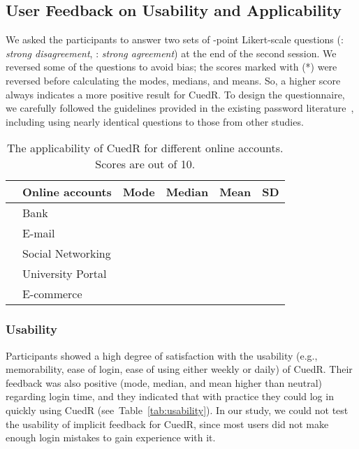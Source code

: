 \subsection{User Feedback on Usability and Applicability}\label{feedback}

We asked the participants to answer two sets of -point Likert-scale questions (: \textit{strong disagreement}, : \textit{strong agreement}) at the end of the second session. We reversed some of the questions to avoid bias; the scores marked with (*) were reversed before calculating the modes, medians, and means. So, a higher score always indicates a more positive result for CuedR. To design the questionnaire, we carefully followed the guidelines provided in the existing password literature~\cite{geopass,ccp,passpoint3}, including using nearly identical questions to those from other studies.

\begin{table}[b]
\renewcommand{\arraystretch}{1.3}
\caption{The applicability of CuedR for different online
  accounts. Scores are out of 10.}
\vspace{0.2cm}
\centering
\begin{tabular}{c@{}lcccc}
\hline
\hspace{0.2cm}&\multicolumn{1}{c}{Online accounts}&Mode&Median&Mean&SD\\ 
\hline
& Bank&&&&\\ 
\cline{2-6}
& E-mail&&&&\\ 
\cline{2-6}
& Social Networking&&&&\\ 
\cline{2-6}
& University Portal&&&&\\ 
\cline{2-6}
& E-commerce&&&&\\ 
\hline
\end{tabular}
\label{tab:applicable}
\end{table}


\subsubsection{Usability} Participants showed a high degree of satisfaction with the usability (e.g., memorability, ease of login, ease of using either weekly or daily) of CuedR. Their feedback was also positive (mode, median, and mean higher than neutral) regarding login time, and they indicated that with practice they could log in quickly using CuedR (see~Table~\ref{tab:usability}). In our study, we could not test the usability of implicit feedback for CuedR, since most users did not make enough login mistakes to gain experience with it.

